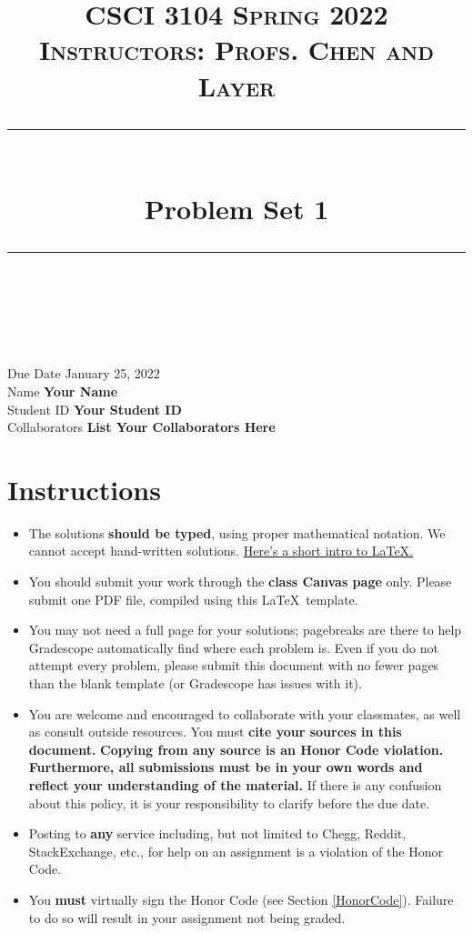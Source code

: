 \documentclass[11pt]{article}
\title{
\normalfont \normalsize 
\textsc{CSCI 3104 Spring 2022 \\ 
Instructors: Profs. Chen and Layer} \\
[10pt] 
\rule{\linewidth}{0.5pt} \\[6pt] 
\huge Problem Set 1 \\
\rule{\linewidth}{2pt}  \\[10pt]
}
\date{}
\theoremstyle{definition}
\theoremstyle{definition}
\theoremstyle{definition}
\begin{document}

\maketitle


\noindent
Due Date \dotfill January 25, 2022 \\
Name \dotfill \textbf{Your Name} \\
Student ID \dotfill \textbf{Your Student ID} \\
Collaborators \dotfill \textbf{List Your Collaborators Here}

\tableofcontents

\section{Instructions}
 \begin{itemize}
	\item The solutions \textbf{should be typed}, using proper mathematical notation. We cannot accept hand-written solutions. \href{http://ece.uprm.edu/~caceros/latex/introduction.pdf}{Here's a short intro to \LaTeX.}
	\item You should submit your work through the \textbf{class Canvas page} only. Please submit one PDF file, compiled using this \LaTeX \ template.
	\item You may not need a full page for your solutions; pagebreaks are there to help Gradescope automatically find where each problem is. Even if you do not attempt every problem, please submit this document with no fewer pages than the blank template (or Gradescope has issues with it).

	\item You are welcome and encouraged to collaborate with your classmates, as well as consult outside resources. You must \textbf{cite your sources in this document.} \textbf{Copying from any source is an Honor Code violation. Furthermore, all submissions must be in your own words and reflect your understanding of the material.} If there is any confusion about this policy, it is your responsibility to clarify before the due date. 

	\item Posting to \textbf{any} service including, but not limited to Chegg, Reddit, StackExchange, etc., for help on an assignment is a violation of the Honor Code.

	\item You \textbf{must} virtually sign the Honor Code (see Section \ref{HonorCode}). Failure to do so will result in your assignment not being graded.
\end{itemize}
\end{document}
